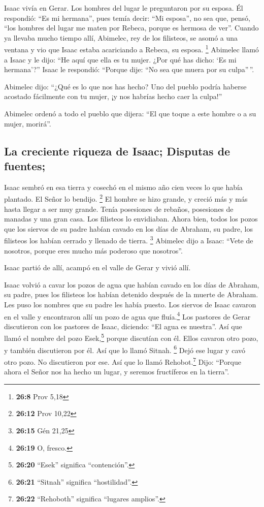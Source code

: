 \begin{paracol}{2}
 Isaac vivía en Gerar.  Los hombres del
lugar le preguntaron por su esposa. Él respondió: ``Es mi hermana'',
pues temía decir: ``Mi esposa'', no sea que, pensó, ``los hombres del
lugar me maten por Rebeca, porque es hermosa de ver''. 
Cuando ya llevaba mucho tiempo allí, Abimelec, rey de los filisteos, se
asomó a una ventana y vio que Isaac estaba acariciando a Rebeca, su
esposa. \footnote{\textbf{26:8} Prov 5,18}  Abimelec llamó
a Isaac y le dijo: ``He aquí que ella es tu mujer. ¿Por qué has dicho:
`Es mi hermana'?'' Isaac le respondió: ``Porque dije: ``No sea que muera
por su culpa''\,''.

 Abimelec dijo: ``¿Qué es lo que nos has hecho? Uno del
pueblo podría haberse acostado fácilmente con tu mujer, ¡y nos habrías
hecho caer la culpa!''

 Abimelec ordenó a todo el pueblo que dijera: ``El que
toque a este hombre o a su mujer, morirá''.

\hypertarget{la-creciente-riqueza-de-isaac-disputas-de-fuentes}{%
\subsection{La creciente riqueza de Isaac; Disputas de
fuentes;}\label{la-creciente-riqueza-de-isaac-disputas-de-fuentes}}

 Isaac sembró en esa tierra y cosechó en el mismo año
cien veces lo que había plantado. El Señor lo bendijo. \footnote{\textbf{26:12}
  Prov 10,22}  El hombre se hizo grande, y creció más y
más hasta llegar a ser muy grande.  Tenía posesiones de
rebaños, posesiones de manadas y una gran casa. Los filisteos lo
envidiaban.  Ahora bien, todos los pozos que los siervos
de su padre habían cavado en los días de Abraham, su padre, los
filisteos los habían cerrado y llenado de tierra. \footnote{\textbf{26:15}
  Gén 21,25}  Abimelec dijo a Isaac: ``Vete de nosotros,
porque eres mucho más poderoso que nosotros''.

 Isaac partió de allí, acampó en el valle de Gerar y
vivió allí.

 Isaac volvió a cavar los pozos de agua que habían cavado
en los días de Abraham, su padre, pues los filisteos los habían detenido
después de la muerte de Abraham. Les puso los nombres que su padre les
había puesto.  Los siervos de Isaac cavaron en el valle y
encontraron allí un pozo de agua que fluía.\footnote{\textbf{26:19} O,
  fresco.}  Los pastores de Gerar discutieron con los
pastores de Isaac, diciendo: ``El agua es nuestra''. Así que llamó el
nombre del pozo Esek,\footnote{\textbf{26:20} ``Esek'' significa
  ``contención''.} porque discutían con él.  Ellos
cavaron otro pozo, y también discutieron por él. Así que lo llamó
Sitnah. \footnote{\textbf{26:21} ``Sitnah'' significa ``hostilidad''.}
 Dejó ese lugar y cavó otro pozo. No discutieron por ese.
Así que lo llamó Rehobot.\footnote{\textbf{26:22} ``Rehoboth'' significa
  ``lugares amplios''.} Dijo: ``Porque ahora el Señor nos ha hecho un
lugar, y seremos fructíferos en la tierra''.


\end{paracol}
